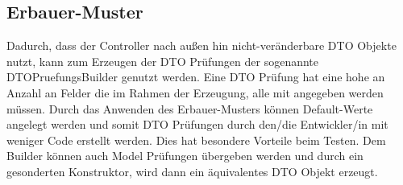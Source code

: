 \subsection{Erbauer-Muster}\label{subsec:erbauer}
Dadurch, dass der Controller nach außen hin nicht-veränderbare DTO Objekte nutzt,
kann zum Erzeugen der DTO Prüfungen der sogenannte DTOPruefungsBuilder genutzt werden.
Eine DTO Prüfung hat eine hohe an Anzahl an Felder die im Rahmen der Erzeugung, alle mit angegeben werden müssen.
Durch das Anwenden des Erbauer-Musters können Default-Werte angelegt werden und somit DTO Prüfungen durch den/die Entwickler/in
mit weniger Code erstellt werden.
Dies hat besondere Vorteile beim Testen.
Dem Builder können auch Model Prüfungen übergeben werden und durch ein gesonderten Konstruktor,
wird dann ein äquivalentes DTO Objekt erzeugt.